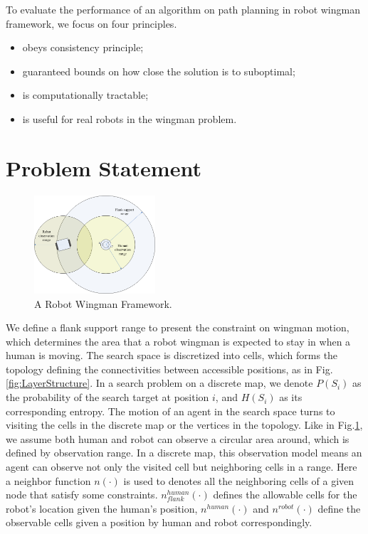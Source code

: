\documentclass[12pt]{article}
\begin{document}
To evaluate the performance of an algorithm on path planning in robot wingman framework, we focus on four principles.
\begin{itemize}
\item obeys consistency principle;
\item guaranteed bounds on how close the solution is to suboptimal;
\item is computationally tractable;
\item is useful for real robots in the wingman problem.
\end{itemize}

\section{Problem Statement}

\begin{figure}[htbp]
\centering
\includegraphics[width=0.4\textwidth]{./images/Wingman}
\caption{A Robot Wingman Framework.}
\label{fig:Wingman}
\end{figure}

We define a flank support range to present the constraint on wingman motion, which determines the area that a robot wingman is expected to stay in when a human is moving. The search space is discretized into cells, which forms the topology defining the connectivities between accessible positions, as in Fig.\ref{fig:LayerStructure}. In a search problem on a discrete map, we denote $ P(S_{i}) $ as the probability of the search target at position $ i $, and $ H(S_{i}) $ as its corresponding entropy. The motion of an agent in the search space turns to visiting the cells in the discrete map or the vertices in the topology. Like in Fig.\ref{fig:Wingman}, we assume both human and robot can observe a circular area around, which is defined by observation range. In a discrete map, this observation model means an agent can observe not only the visited cell but neighboring cells in a range. Here a neighbor function $ n(\cdot) $ is used to denotes all the neighboring cells of a given node that satisfy some constraints. $ n_{flank}^{human}(\cdot) $ defines the allowable cells for the robot's location given the human's position, $ n^{human}(\cdot) $  and $ n^{robot}(\cdot) $ define the observable cells given a position by human and robot correspondingly. 
\end{document}
